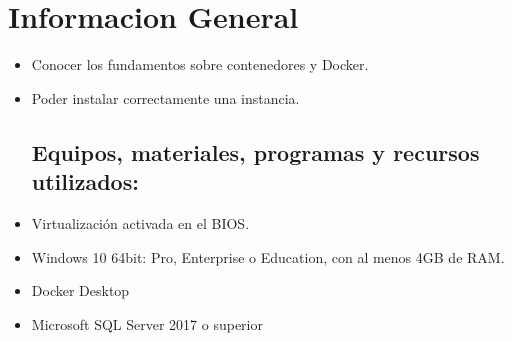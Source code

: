 \section{Informacion General} 

\begin{itemize}
\subsection{Objetivos:}
	\item Conocer los fundamentos sobre contenedores y Docker.
	\item Poder instalar correctamente una instancia.
\subsection{Equipos, materiales, programas y recursos utilizados:}
	\item Virtualización activada en el BIOS.
	\item Windows 10 64bit: Pro, Enterprise o Education, con al menos 4GB de RAM.
	\item Docker Desktop
	\item Microsoft SQL Server 2017 o superior

\end{itemize}
